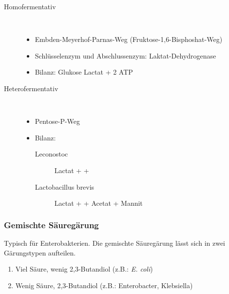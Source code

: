 \begin{description}
	\item[Homofermentativ]	\hfill	\\
		\begin{itemize}
			\item Embden-Meyerhof-Parnas-Weg (Fruktose-1,6-Bisphoshat-Weg)
			\item Schlüsselenzym und Abschlussenzym: Laktat-Dehydrogenase
			\item Bilanz: Glukose  Lactat + 2 ATP
		\end{itemize}

	\item[Heterofermentativ]	\hfill	\\
		\begin{itemize}
			\item Pentose-P-Weg
			\item Bilanz:
				\begin{description}
					\item[Leconostoc] Lactat +  + 
					\item[Lactobacillus brevis] Lactat +  + Acetat + Mannit
				\end{description}
		\end{itemize}
\end{description}

\subsubsection{Gemischte Säuregärung}
Typisch für Enterobakterien.
Die gemischte Säuregärung lässt sich in zwei Gärungstypen aufteilen.

\begin{enumerate}
	\item Viel Säure, wenig 2,3-Butandiol (z.B.: \emph{E. coli})
	\item Wenig Säure, 2,3-Butandiol (z.B.: Enterobacter, Klebsiella)
\end{enumerate}
